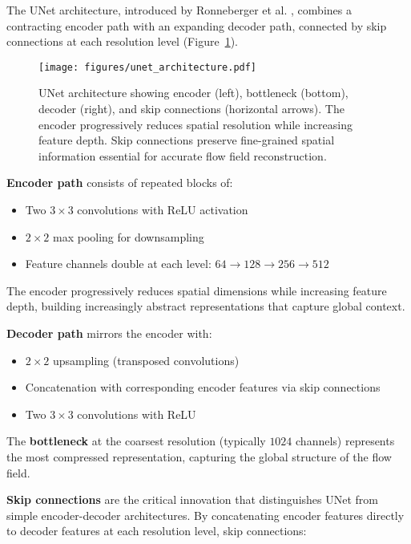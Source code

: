 The UNet architecture, introduced by Ronneberger et al. \cite{ronneberger2015unet}, combines a contracting encoder path with an expanding decoder path, connected by skip connections at each resolution level (Figure~\ref{fig:unet_architecture}).

\begin{figure}[htbp]
    \centering
    \texttt{[image: figures/unet\_architecture.pdf]}
    \caption{UNet architecture showing encoder (left), bottleneck (bottom), decoder (right), and skip connections (horizontal arrows). The encoder progressively reduces spatial resolution while increasing feature depth. Skip connections preserve fine-grained spatial information essential for accurate flow field reconstruction.}
    \label{fig:unet_architecture}
\end{figure}

\textbf{Encoder path} consists of repeated blocks of:
\begin{itemize}
    \item Two $3 \times 3$ convolutions with ReLU activation
    \item $2 \times 2$ max pooling for downsampling
    \item Feature channels double at each level: $64 \rightarrow 128 \rightarrow 256 \rightarrow 512$
\end{itemize}

The encoder progressively reduces spatial dimensions while increasing feature depth, building increasingly abstract representations that capture global context.

\textbf{Decoder path} mirrors the encoder with:
\begin{itemize}
    \item $2 \times 2$ upsampling (transposed convolutions)
    \item Concatenation with corresponding encoder features via skip connections
    \item Two $3 \times 3$ convolutions with ReLU
\end{itemize}

The \textbf{bottleneck} at the coarsest resolution (typically $1024$ channels) represents the most compressed representation, capturing the global structure of the flow field.

\textbf{Skip connections} are the critical innovation that distinguishes UNet from simple encoder-decoder architectures. By concatenating encoder features directly to decoder features at each resolution level, skip connections:

